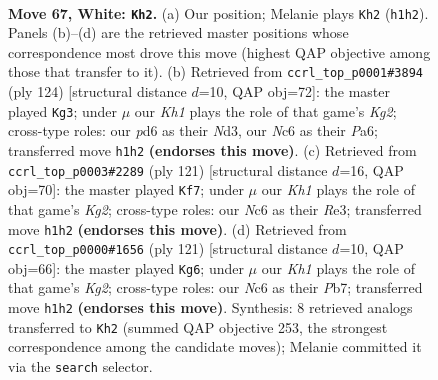 \documentclass[11pt]{article}
\begin{document}
\clearpage

\begin{figure}[p]\centering
\begin{subfigure}{0.46\textwidth}\centering
\resizebox{\linewidth}{!}{%
\newchessgame
\chessboard[
  setfen={8/1R6/2Np4/8/5k2/7p/6p1/4n2K w - - 0 67},
  showmover=false,
  pgfstyle=straightmove, color=movearrow, markmove={h1-h2}
]}
\caption{}
\end{subfigure}\hfill
\begin{subfigure}{0.46\textwidth}\centering
\resizebox{\linewidth}{!}{%
\newchessgame
\chessboard[
  setfen={8/k7/P7/8/3n2p1/3N1p2/6K1/8 w - - 0 63},
  showmover=false,
  pgfstyle=straightmove, color=movearrow, markmove={g2-g3}
]}
\caption{}
\end{subfigure}
\\[4pt]
\begin{subfigure}{0.46\textwidth}\centering
\resizebox{\linewidth}{!}{%
\newchessgame
\chessboard[
  setfen={8/6k1/5P2/7P/4N1K1/4r3/8/8 b - - 0 61},
  showmover=false,
  pgfstyle=straightmove, color=movearrow, markmove={g7-f7}
]}
\caption{}
\end{subfigure}\hfill
\begin{subfigure}{0.46\textwidth}\centering
\resizebox{\linewidth}{!}{%
\newchessgame
\chessboard[
  setfen={8/1p4k1/4K2P/2P5/4N1P1/8/8/2r5 b - - 0 61},
  showmover=false,
  pgfstyle=straightmove, color=movearrow, markmove={g7-g6}
]}
\caption{}
\end{subfigure}
\caption{\textbf{Move 67, White: \texttt{Kh2}.} (a) Our position; Melanie plays \texttt{Kh2} (\texttt{h1h2}). Panels (b)--(d) are the retrieved master positions whose correspondence most drove this move (highest QAP objective among those that transfer to it). (b) Retrieved from \texttt{ccrl\_top\_p0001\#3894} (ply 124) [structural distance $d$=10, QAP obj=72]: the master played \texttt{Kg3}; under $\mu$ our \emph{Kh1} plays the role of that game's \emph{Kg2}; cross-type roles: our \emph{p}d6 as their \emph{N}d3, our \emph{N}c6 as their \emph{P}a6; transferred move \texttt{h1h2} \textbf{(endorses this move)}. (c) Retrieved from \texttt{ccrl\_top\_p0003\#2289} (ply 121) [structural distance $d$=16, QAP obj=70]: the master played \texttt{Kf7}; under $\mu$ our \emph{Kh1} plays the role of that game's \emph{Kg2}; cross-type roles: our \emph{N}c6 as their \emph{R}e3; transferred move \texttt{h1h2} \textbf{(endorses this move)}. (d) Retrieved from \texttt{ccrl\_top\_p0000\#1656} (ply 121) [structural distance $d$=10, QAP obj=66]: the master played \texttt{Kg6}; under $\mu$ our \emph{Kh1} plays the role of that game's \emph{Kg2}; cross-type roles: our \emph{N}c6 as their \emph{P}b7; transferred move \texttt{h1h2} \textbf{(endorses this move)}. Synthesis: 8 retrieved analogs transferred to \texttt{Kh2} (summed QAP objective 253, the strongest correspondence among the candidate moves); Melanie committed it via the \texttt{search} selector.}
\label{fig:thought-m132}
\end{figure}
\end{document}

